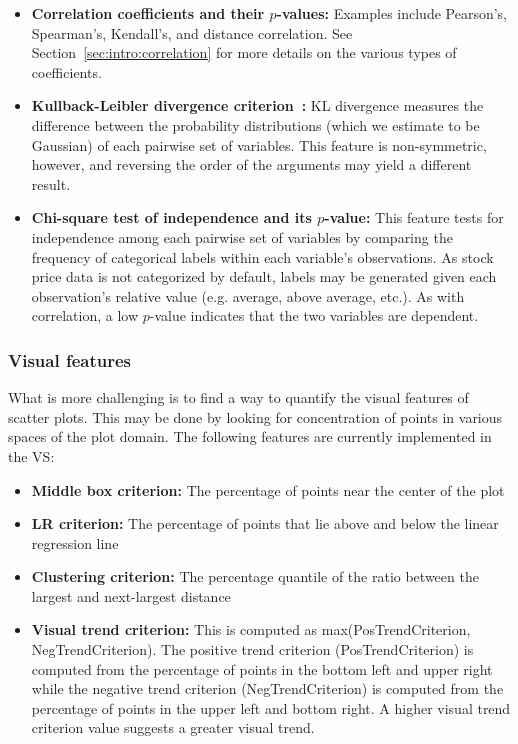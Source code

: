 \tablespacing
\begin{itemize}
	\item \textbf{Correlation coefficients and their $p$-values:} Examples 
	include Pearson's, Spearman's, Kendall's, and distance correlation. See 
	Section~\ref{sec:intro:correlation} for more details on the various types 
	of coefficients.
	\item \textbf{Kullback-Leibler divergence criterion~\cite{seghouane2007}:} 
	KL divergence 
	measures the difference between the probability distributions (which we 
	estimate to be Gaussian) of each pairwise set of variables. This feature is 
	non-symmetric, however, and reversing the order of the arguments 
	may yield a different result.
	\item \textbf{Chi-square test of independence and its $p$-value:} This 
	feature tests for independence among each pairwise set of variables 
	by comparing the frequency of categorical labels within each variable's 
	observations. As stock price data is not categorized by default, labels may 
	be generated given each observation's relative value (e.g. average, above 
	average, etc.). As with correlation, a low $p$-value indicates that 
	the two variables are dependent.
\end{itemize}
\bodyspacing 

\subsubsection{Visual features}

What is more challenging is to find a way to quantify the visual features of 
scatter plots. This may be done by looking for concentration of points in 
various spaces of the plot domain. The following features are currently 
implemented in the VS: 

\tablespacing
\begin{itemize}
	\item \textbf{Middle box criterion:} The percentage of points near the 
	center of the plot
	\item \textbf{LR criterion:} The percentage of points that lie above and 
	below the linear regression line
	\item \textbf{Clustering criterion:} The percentage quantile of the ratio 
	between the largest and next-largest distance
	\item \textbf{Visual trend criterion:} This is computed as 
	max(PosTrendCriterion, NegTrendCriterion). The positive trend criterion 
	(PosTrendCriterion) is computed from the percentage of points in the bottom 
	left and upper right while the negative trend criterion (NegTrendCriterion) 
	is computed from the percentage of points in the upper left and 
	bottom right. A higher visual trend criterion value suggests a greater 
	visual trend. 
\end{itemize}
\bodyspacing